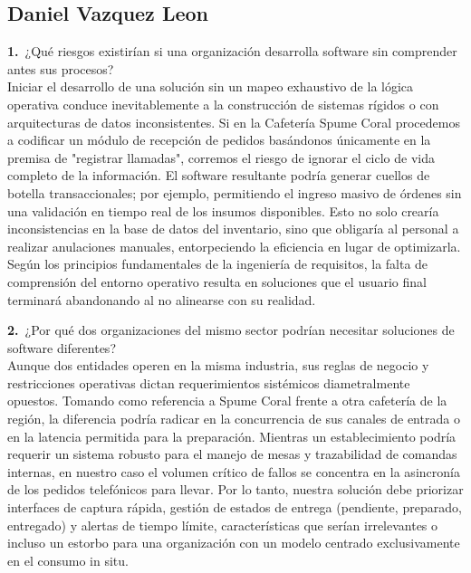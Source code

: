 \documentclass[12pt,letterpaper]{article}
\newcommand{\negr}[1]{\textsf{\bfseries\color{verde} #1}}
\begin{document}
\subsection{Daniel Vazquez Leon}
\noindent\negr{1.}\ ¿Qué riesgos existirían si una organización desarrolla software sin comprender antes sus procesos?\\
Iniciar el desarrollo de una solución sin un mapeo exhaustivo de la lógica operativa conduce inevitablemente a la construcción de sistemas rígidos o con arquitecturas de datos inconsistentes. Si en la Cafetería Spume Coral procedemos a codificar un módulo de recepción de pedidos basándonos únicamente en la premisa de "registrar llamadas", corremos el riesgo de ignorar el ciclo de vida completo de la información. El software resultante podría generar cuellos de botella transaccionales; por ejemplo, permitiendo el ingreso masivo de órdenes sin una validación en tiempo real de los insumos disponibles. Esto no solo crearía inconsistencias en la base de datos del inventario, sino que obligaría al personal a realizar anulaciones manuales, entorpeciendo la eficiencia en lugar de optimizarla. Según los principios fundamentales de la ingeniería de requisitos, la falta de comprensión del entorno operativo resulta en soluciones que el usuario final terminará abandonando al no alinearse con su realidad.

\vspace{0.4cm}
\noindent\negr{2.}\ ¿Por qué dos organizaciones del mismo sector podrían necesitar soluciones de software diferentes?\\
Aunque dos entidades operen en la misma industria, sus reglas de negocio y restricciones operativas dictan requerimientos sistémicos diametralmente opuestos. Tomando como referencia a Spume Coral frente a otra cafetería de la región, la diferencia podría radicar en la concurrencia de sus canales de entrada o en la latencia permitida para la preparación. Mientras un establecimiento podría requerir un sistema robusto para el manejo de mesas y trazabilidad de comandas internas, en nuestro caso el volumen crítico de fallos se concentra en la asincronía de los pedidos telefónicos para llevar. Por lo tanto, nuestra solución debe priorizar interfaces de captura rápida, gestión de estados de entrega (pendiente, preparado, entregado) y alertas de tiempo límite, características que serían irrelevantes o incluso un estorbo para una organización con un modelo centrado exclusivamente en el consumo in situ.
\end{document}
